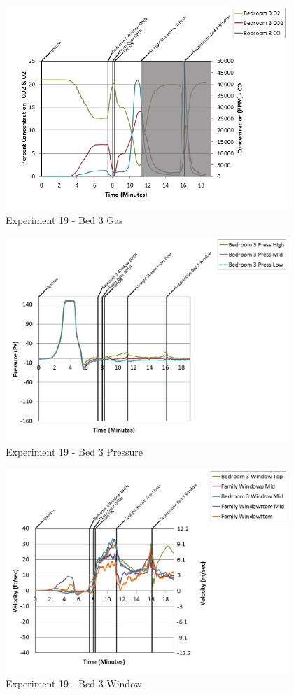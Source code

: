 \documentclass{article}
\begin{document}
\begin{appendices}
\clearpage

\begin{figure}[h!]
	\centering
	\includegraphics[height=3.05in]{0_Images/Results_Charts/Exp_19_Charts/Bed3Gas.png}
	\caption{Experiment 19 - Bed 3 Gas}
\end{figure}


\begin{figure}[h!]
	\centering
	\includegraphics[height=3.05in]{0_Images/Results_Charts/Exp_19_Charts/Bed3Pressure.png}
	\caption{Experiment 19 - Bed 3 Pressure}
\end{figure}

\clearpage

\begin{figure}[h!]
	\centering
	\includegraphics[height=3.05in]{0_Images/Results_Charts/Exp_19_Charts/Bed3Window.png}
	\caption{Experiment 19 - Bed 3 Window}
\end{figure}



\end{appendices}
\end{document}
